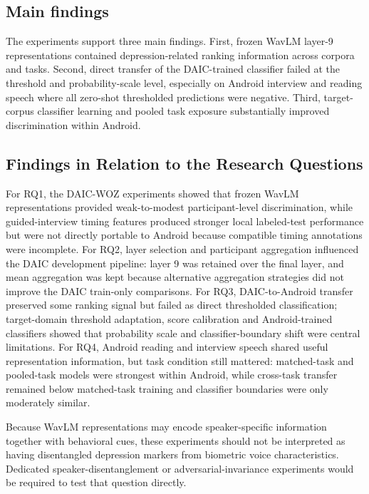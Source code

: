 \documentclass[lettersize,journal]{IEEEtran}
\begin{document}
\subsection{Main findings}

The experiments support three main findings. First, frozen WavLM layer-9 representations contained depression-related ranking information across corpora and tasks. Second, direct transfer of the DAIC-trained classifier failed at the threshold and probability-scale level, especially on Android interview and reading speech where all zero-shot thresholded predictions were negative. Third, target-corpus classifier learning and pooled task exposure substantially improved discrimination within Android.

\subsection{Findings in Relation to the Research Questions}

For RQ1, the DAIC-WOZ experiments showed that frozen WavLM representations provided weak-to-modest participant-level discrimination, while guided-interview timing features produced stronger local labeled-test performance but were not directly portable to Android because compatible timing annotations were incomplete. For RQ2, layer selection and participant aggregation influenced the DAIC development pipeline: layer 9 was retained over the final layer, and mean aggregation was kept because alternative aggregation strategies did not improve the DAIC train-only comparisons. For RQ3, DAIC-to-Android transfer preserved some ranking signal but failed as direct thresholded classification; target-domain threshold adaptation, score calibration and Android-trained classifiers showed that probability scale and classifier-boundary shift were central limitations. For RQ4, Android reading and interview speech shared useful representation information, but task condition still mattered: matched-task and pooled-task models were strongest within Android, while cross-task transfer remained below matched-task training and classifier boundaries were only moderately similar.

Because WavLM representations may encode speaker-specific information together with behavioral cues, these experiments should not be interpreted as having disentangled depression markers from biometric voice characteristics. Dedicated speaker-disentanglement or adversarial-invariance experiments would be required to test that question directly.
\end{document}
